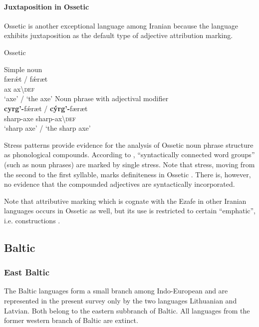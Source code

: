 \paragraph*{Juxtaposition in Ossetic}
Ossetic is another exceptional language among Iranian because the language exhibits juxtaposition as the default type of adjective attribution marking.
\begin{exe}
\label{ossetic attrcomp}
\ex \rm{Ossetic \citep[12]{abaev1964}}
\begin{xlist}
\ex \rm{Simple noun}\\
\gll	færǽt / fǽræt\\
	ax { } ax\textbackslash\textsc{def}\\
\glt	‘axe’ / ‘the axe’
\ex \rm{Noun phrase with adjectival modifier}\\
\gll	\textbf{cyrg'-}fǽræt / \textbf{cýrg'-}færæt\\
	sharp-axe { } sharp-ax\textbackslash\textsc{def}\\
\glt	‘sharp axe’ / ‘the sharp axe’
\end{xlist}
\end{exe}
Stress patterns provide evidence for the analysis of Ossetic noun phrase structure as phonological compounds. According to \citet[10]{abaev1964}, “syntactically connected word groups” (such as noun phrases) are marked by single stress. Note that stress, moving from the second to the first syllable, marks definiteness in Ossetic \citep[12]{abaev1964}. There is, however, no evidence that the compounded adjectives are syntactically incorporated.

Note that attributive  marking which is cognate with the Ezafe in other Iranian languages occurs in Ossetic as well, but its use is restricted to certain “emphatic”, i.e.  constructions \cite[467]{thodarson1989}.

\subsection{Baltic} \label{baltic synchr}
\subsubsection{East Baltic}
The Baltic languages form a small branch among Indo-European and are represented in the present survey only by the two languages Lithuanian and Latvian. Both belong to the eastern subbranch of Baltic. All languages from the former western branch of Baltic are extinct.

